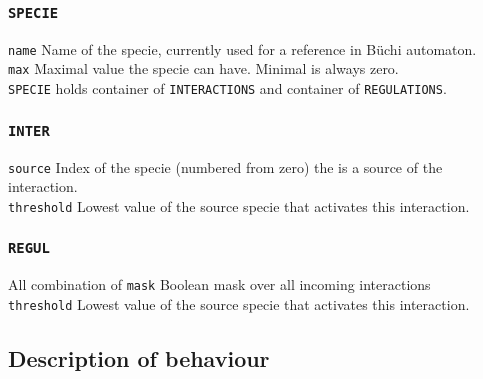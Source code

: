 \documentclass[12pt]{article}
\begin{document}
\subsubsection {\texttt{SPECIE}}
\texttt{name} Name of the specie, currently used for a reference in B\"{u}chi automaton. \\
\texttt{max} Maximal value the specie can have. Minimal is always zero.\\
\texttt{SPECIE} holds container of \texttt{INTERACTIONS} and container of \texttt{REGULATIONS}. 

\subsubsection {\texttt{INTER}}
\texttt{source} Index of the specie (numbered from zero) the is a source of the interaction. \\
\texttt{threshold} Lowest value of the source specie that activates this interaction.

\subsubsection {\texttt{REGUL}}
All combination of 
\texttt{mask} Boolean mask over all incoming interactions \\
\texttt{threshold} Lowest value of the source specie that activates this interaction.

\subsection{Description of behaviour}
\end{document}
